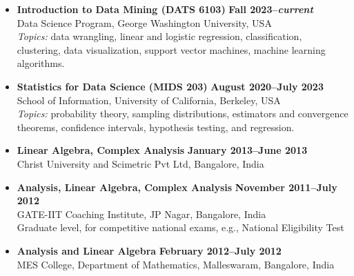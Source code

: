 \documentclass[11pt]{article}
\begin{document}
\begin{itemize}[leftmargin=*]
\item \textbf{Introduction to Data Mining (DATS 6103)} \hfill
  \textbf{\footnotesize Fall 2023--\emph{current}}\\
  Data Science Program, George Washington University, USA \\
  \emph{Topics:} data wrangling, linear and logistic
  regression, classification, clustering, data visualization, support vector
  machines, machine learning algorithms.

\item \textbf{Statistics for Data Science (MIDS 203)} \hfill
  \textbf{\footnotesize August 2020--July 2023}\\
  School of Information, University of California, Berkeley, USA \\
  \emph{Topics:} probability theory,
  sampling distributions, estimators and convergence theorems, 
  confidence intervals, hypothesis testing, and regression.

\item \textbf{Linear Algebra, Complex Analysis}
  \hfill \textbf{\footnotesize January 2013--June 2013}\\
  Christ University and Scimetric Pvt Ltd, Bangalore, India
 
\item  \textbf{Analysis, Linear Algebra, Complex Analysis}
  \hfill  \textbf{\footnotesize November 2011--July 2012} \\
  GATE-IIT Coaching Institute, JP Nagar, Bangalore, India \\
  Graduate level,  for competitive national exams, e.g., National Eligibility Test 
\item \textbf{Analysis and Linear Algebra}
  \hfill \textbf{\footnotesize February 2012--July 2012} \\
  MES College, Department of Mathematics, Malleswaram, Bangalore, India 
\end{itemize}
\end{document}
